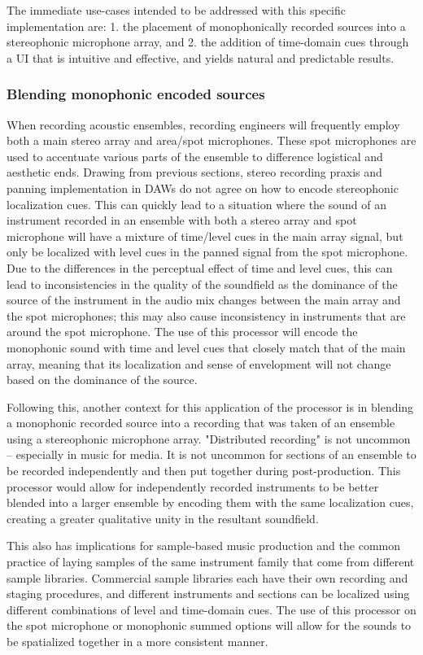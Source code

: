 The immediate use-cases intended to be addressed with this specific implementation are: 1. the placement of monophonically recorded sources into a stereophonic microphone array, and 2. the addition of time-domain cues through a UI that is intuitive and effective, and yields natural and predictable results.

\subsubsection{Blending monophonic encoded sources}

When recording acoustic ensembles, recording engineers will frequently employ both a main stereo array and area/spot microphones. These spot microphones are used to accentuate various parts of the ensemble to difference logistical and aesthetic ends. Drawing from previous sections, stereo recording praxis and panning implementation in DAWs do not agree on how to encode stereophonic localization cues. This can quickly lead to a situation where the sound of an instrument recorded in an ensemble with both a stereo array and spot microphone will have a mixture of time/level cues in the main array signal, but only be localized with level cues in the panned signal from the spot microphone. Due to the differences in the perceptual effect of time and level cues, this can lead to inconsistencies in the quality of the soundfield as the dominance of the source of the instrument in the audio mix changes between the main array and the spot microphones; this may also cause inconsistency in instruments that are around the spot microphone. The use of this processor will encode the monophonic sound with time and level cues that closely match that of the main array, meaning that its localization and sense of envelopment will not change based on the dominance of the source.

Following this, another context for this application of the processor is in blending a monophonic recorded source into a recording that was taken of an ensemble using a stereophonic microphone array. "Distributed recording" is not uncommon -- especially in music for media. It is not uncommon for sections of an ensemble to be recorded independently and then put together during post-production. This processor would allow for independently recorded instruments to be better blended into a larger ensemble by encoding them with the same localization cues, creating a greater qualitative unity in the resultant soundfield.

This also has implications for sample-based music production and the common practice of laying samples of the same instrument family that come from different sample libraries. Commercial sample libraries each have their own recording and staging procedures, and different instruments and sections can be localized using different combinations of level and time-domain cues. The use of this processor on the spot microphone or monophonic summed options will allow for the sounds to be spatialized together in a more consistent manner.

